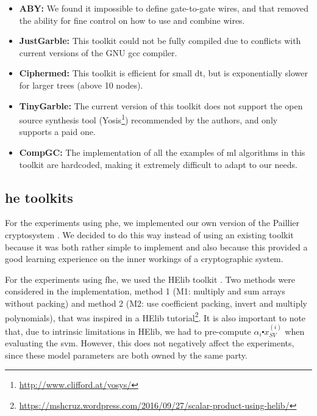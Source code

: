 \begin{itemize}
    
    \item\textbf{ABY\cite{demmler2015aby}:} We found it impossible to define gate-to-gate wires, and that removed the ability for fine control on how to use and combine wires.

    \item\textbf{JustGarble\cite{bellare2013efficient}:} This toolkit could not be fully compiled due to conflicts with current versions of the GNU gcc compiler.

    \item\textbf{Ciphermed\cite{bost2015machine}:} This toolkit is efficient for small \ac{dt}, but is exponentially slower for larger trees (above 10 nodes).

    \item\textbf{TinyGarble\cite{songhori2015tinygarble}:} The current version of this toolkit does not support the open source synthesis tool (Yosis\footnote{\url{http://www.clifford.at/yosys/}}) recommended by the authors, and only supports a paid one.

    \item\textbf{CompGC\cite{groce2016compgc}:} The implementation of all the examples of \ac{ml} algorithms in this toolkit are hardcoded, making it extremely difficult to adapt to our needs.

\end{itemize}

\subsection{\acl{he} toolkits}

For the experiments using \ac{phe}, we implemented our own version of the Paillier cryptosystem \cite{paillier1999public}. We decided to do this way instead of using an existing toolkit because it was both rather simple to implement and also because this provided a good learning experience on the inner workings of a cryptographic system.

For the experiments using \ac{fhe}, we used the HElib toolkit \cite{halevi2014helib}. Two methods were considered in the implementation, method 1 (M1: multiply and sum arrays without packing) and method 2 (M2: use coefficient packing, invert and multiply polynomials), that was inspired in a HElib tutorial\footnote{\url{https://mshcruz.wordpress.com/2016/09/27/scalar-product-using-helib/}}. It is also important to note that, due to intrinsic limitations in HElib, we had to pre-compute $\alpha_i\centerdot x_{SV}^{(i)}$ when evaluating the \ac{svm}. However, this does not negatively affect the experiments, since these model parameters are both owned by the same party.



